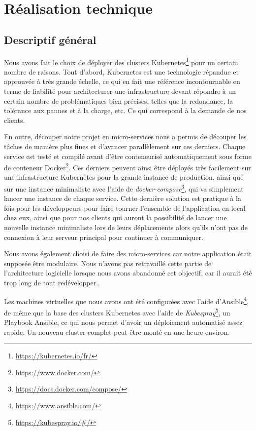\chapter{Réalisation technique}

\section{Descriptif général}

Nous avons fait le choix de déployer des clusters
Kubernetes\footnote{\url{https://kubernetes.io/fr/}}
pour un certain nombre de raisons. Tout d'abord, Kubernetes est une
technologie répandue et approuvée à très grande échelle, ce qui en fait
une référence incontournable en terme de fiabilité pour architecturer
une infrastructure devant répondre à un certain nombre de problématiques
bien précises, telles que la redondance, la tolérance aux pannes et à la
charge, etc. Ce qui correspond à la demande de nos clients.

En outre, découper notre projet en micro-services nous a permis de
découper les tâches de manière plus fines et d'avancer parallèlement sur
ces derniers. Chaque service est testé et compilé avant d'être
conteneurisé automatiquement sous forme de conteneur
Docker\footnote{\url{https://www.docker.com/}}. Ces
derniers peuvent ainsi être déployés très facilement sur une
infrastructure Kubernetes pour la grande instance de production, ainsi
que sur une instance minimaliste avec l'aide de
\textit{docker-compose}\footnote{\url{https://docs.docker.com/compose/}},
qui va simplement lancer une instance de chaque service. Cette dernière
solution est pratique à la fois pour les développeurs pour faire tourner
l'ensemble de l'application en local chez eux, ainsi que pour nos
clients qui auront la possibilité de lancer une nouvelle instance
minimaliste lors de leurs déplacements alors qu'ils n'ont pas de
connexion à leur serveur principal pour continuer à communiquer.

Nous avons également choisi de faire des micro-services car notre
application était supposée être modulaire. Nous n'avons pas retravaillé
cette partie de l'architecture logicielle lorsque nous avons abandonné
cet objectif, car il aurait été trop long de tout redévelopper..

Les machines virtuelles que nous avons ont été configurées avec l'aide
d'Ansible\footnote{\url{https://www.ansible.com/}}, de
même que la base des clusters Kubernetes avec l'aide de
\textit{Kubespray}\footnote{\url{https://kubespray.io/\#/}}, un
Playbook Ansible, ce qui nous permet d'avoir un déploiement automatisé
assez rapide. Un nouveau cluster complet peut être monté en une heure
environ.

